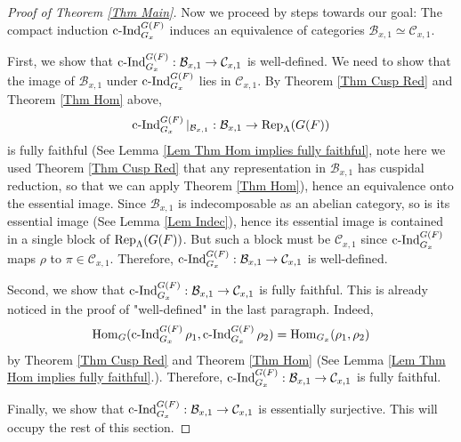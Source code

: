 	\begin{proof}[Proof of Theorem \ref{Thm Main}]
	
	Now we proceed by steps towards our goal: The compact induction $\operatorname{\operatorname{c-Ind}}_{G_x}^{G(F)}$ induces an equivalence of categories $\mathcal{B}_{x,1} \simeq \mathcal{C}_{x,1}$. 
	
	First, we show that $\operatorname{\operatorname{c-Ind}}_{G_x}^{G(F)}: \mathcal{B}_{x,1} \to \mathcal{C}_{x,1}$ is well-defined. We need to show that the image of $\mathcal{B}_{x,1}$ under $\operatorname{\operatorname{c-Ind}}_{G_x}^{G(F)}$ lies in $\mathcal{C}_{x,1}$. By Theorem \ref{Thm Cusp Red} and Theorem \ref{Thm Hom} above, $$\operatorname{\operatorname{c-Ind}}_{G_x}^{G(F)}|_{\mathcal{B}_{x,1}}: \mathcal{B}_{x,1} \to \operatorname{\operatorname{Rep}}_{\Lambda}(G(F))$$
	is fully faithful (See Lemma \ref{Lem Thm Hom implies fully faithful}, note here we used Theorem \ref{Thm Cusp Red} that any representation in $\mathcal{B}_{x,1}$ has cuspidal reduction, so that we can apply Theorem \ref{Thm Hom}), hence an equivalence onto the essential image. Since $\mathcal{B}_{x,1}$ is indecomposable as an abelian category, so is its essential image (See Lemma \ref{Lem Indec}), hence its essential image is contained in a single block of $\operatorname{\operatorname{Rep}}_{\Lambda}(G(F))$. But such a block must be $\mathcal{C}_{x,1}$ since $\operatorname{\operatorname{c-Ind}}_{G_x}^{G(F)}$ maps $\rho$ to $\pi \in \mathcal{C}_{x,1}$. Therefore, $\operatorname{\operatorname{c-Ind}}_{G_x}^{G(F)}: \mathcal{B}_{x,1} \to \mathcal{C}_{x,1}$ is well-defined.
	
	Second, we show that $\operatorname{\operatorname{c-Ind}}_{G_x}^{G(F)}: \mathcal{B}_{x,1} \to \mathcal{C}_{x,1}$ is fully faithful. This is already noticed in the proof of "well-defined" in the last paragraph. Indeed, 
	$$\operatorname{\operatorname{Hom}}_G(\operatorname{\operatorname{c-Ind}}_{G_x}^{G(F)}\rho_1, \operatorname{\operatorname{c-Ind}}_{G_x}^{G(F)}\rho_2)=\operatorname{\operatorname{Hom}}_{G_x}(\rho_1, \rho_2)$$
	by Theorem \ref{Thm Cusp Red} and Theorem \ref{Thm Hom} (See Lemma \ref{Lem Thm Hom implies fully faithful}.). Therefore, $\operatorname{\operatorname{c-Ind}}_{G_x}^{G(F)}: \mathcal{B}_{x,1} \to \mathcal{C}_{x,1}$ is fully faithful.
	
	Finally, we show that $\operatorname{\operatorname{c-Ind}}_{G_x}^{G(F)}: \mathcal{B}_{x,1} \to \mathcal{C}_{x,1}$ is essentially surjective. This will occupy the rest of this section. 
	

\end{proof}
